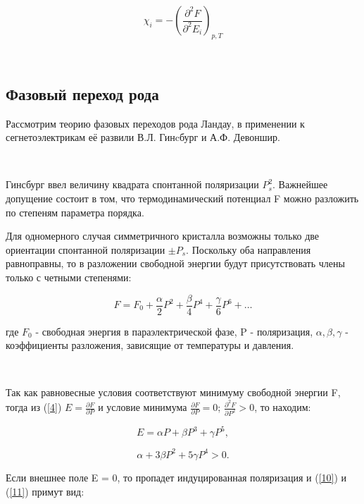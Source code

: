 \documentclass[a4paper]{article}
\begin{document}
\begin{equation}
\chi_i =- \left( \frac{\partial^2 F}{\partial^2 E_i} \right)_{p, T}
\label{8}
\end{equation}

\ 

\newcommand{\RNumb}[1]{\uppercase\expandafter{\romannumeral #1\relax}}

\subsection{Фазовый переход \RNumb{2} рода}

Рассмотрим теорию фазовых переходов \RNumb{2} рода Ландау, в применении к сегнетоэлектрикам её развили В.Л. Гинcбург и А.Ф. Девоншир. 

 \
 
Гинсбург ввел величину квадрата спонтанной поляризации $P^2_s$. Важнейшее допущение состоит в том, что термодинамический потенциал F можно разложить по степеням параметра порядка. 
 
 
 
Для одномерного случая симметричного кристалла возможны только две ориентации спонтанной поляризации $\pm P_s$. Поскольку оба направления равноправны, то в разложении свободной энергии будут присутствовать члены только с четными степенями:

\begin{equation}
F = F_0 + \frac{\alpha}{2} P^2 + \frac{\beta}{4} P^4 + \frac{\gamma}{6} P^6 + \ldots
\label{9}
\end{equation}

где $F_0$ - свободная энергия в параэлектрической фазе, P - поляризация, $\alpha , \beta , \gamma$ - коэффициенты разложения, зависящие от температуры и давления. 

\

Так как равновесные условия соответствуют минимуму свободной энергии F, тогда из (\ref{4}) $E = \frac{\partial F}{\partial P}$ и условие минимума $\frac{\partial F}{\partial P} = 0$; $\frac{\partial^2 F}{\partial P^2} > 0$, то находим:

\begin{equation}
E = \alpha P + \beta P^3 + \gamma P^5,
\label{10}
\end{equation}

\begin{equation}
\alpha + 3\beta P^2 + 5\gamma P^4 > 0.
\label{11}
\end{equation}

Если внешнее поле E = 0, то пропадет индуцированная поляризация и  (\ref{10}) и (\ref{11}) примут вид:
\end{document}
